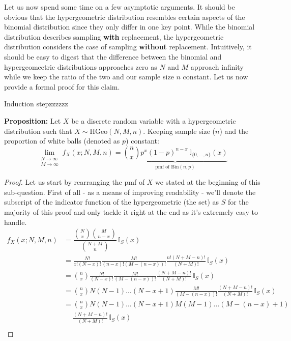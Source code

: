 \documentclass[12pt]{article}
\begin{document}
\begin{enumerate}
\begin{enumerate}
Let us now spend some time on a few asymptotic arguments. It should be obvious that the hypergeometric distribution resembles certain aspects of the binomial distribution since they only differ in one key point. While the binomial distribution describes sampling \textbf{with} replacement, the hypergeometric distribution considers the case of sampling \textbf{without} replacement. Intuitively, it should be easy to digest that the difference between the binomial and hypergeomeetric distributions approaches zero as $N$ and $M$ approach infinity while we keep the ratio of the two  and our sample size $n$ constant. Let us now provide a formal proof for this claim.
\begin{labeling}{Induction stepzzzzzz}
\item[\textbf{Proposition:}] Let $X$ be a discrete random variable with a hypergeometric distribution such that $X \sim \text{HGeo}(N,M,n)$. Keeping sample size ($n$) and the proportion of white balls (denoted as $p$) constant:
\begin{equation*}
\lim_{\substack{N \to \infty \\ M \to \infty}} f_X(x;N,M,n) = \underbrace{\binom{n}{x} p^{x} (1-p)^{n-x} \, \mathbb{I}_{\{0, \ldots, n\}}(x)}_{\text{pmf of Bin}(n,p)}
\end{equation*} 
\end{labeling}
\begin{proof}
Let us start by rearranging the pmf of $X$ we stated at the beginning of this sub-question. First of all - as a means of improving readability - we'll denote the subscript of the indicator function of the hypergeometric (the set) as $S$ for the majority of this proof and only tackle it right at the end as it's extremely easy to handle.
\begin{align*}
f_{X}(x; N, M, n) &= \dfrac{\binom{N}{x} \binom{M}{n-x}}{\binom{N+M}{n}} \, \mathbb{I}_{S}(x) \\
&= \frac{N!}{x!(N-x)!} \frac{M!}{(n-x)!(M-(n-x))!} \frac{n!(N+M-n)!}{(N+M)!} \, \mathbb{I}_{S}(x) \\
&= \binom{n}{x} \frac{N!}{(N-x)!} \frac{M!}{(M-(n-x))!} \frac{(N+M-n)!}{(N+M)!} \, \mathbb{I}_{S}(x) \\
&= \binom{n}{x} N(N-1)\ldots(N-x+1) \frac{M!}{(M-(n-x))!} \frac{(N+M-n)!}{(N+M)!} \, \mathbb{I}_{S}(x) \\
&= \binom{n}{x} N(N-1)\ldots(N-x+1) M(M-1)\ldots(M-(n-x)+1) \\ 
&\quad \; \frac{(N+M-n)!}{(N+M)!} \, \mathbb{I}_{S}(x) \\

\end{align*}
\end{proof}
\end{enumerate}
\end{enumerate}
\end{document}
